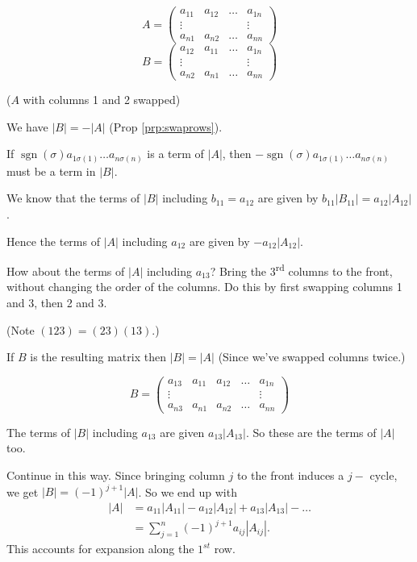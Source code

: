 \documentclass{article}
\theoremstyle{definition} \newtheorem*{definition}{Definition}
\newcommand{\ts}{\textsuperscript}
\DeclareMathOperator{\sgn}{sgn} \DeclareMathOperator{\id}{id}
\begin{document}
    \[
    A = \left( 
    \begin{matrix}
      a_{11} & a_{12} & \dots & a_{1n} \\
      \vdots &        &       & \vdots \\
      a_{n1} & a_{n2} & \dots & a_{nn}
    \end{matrix}
    \right)
  \]
  \[
    B = \left( 
    \begin{matrix}
      a_{12} & a_{11} & \dots & a_{1n} \\
      \vdots &        &       & \vdots \\
      a_{n2} & a_{n1} & \dots & a_{nn}
    \end{matrix}
    \right)
    \]

   ($A$ with columns 1 and 2 swapped)

   We have $|B| = -|A|$ (Prop \ref{prp:swaprows}).

   If $\sgn(\sigma)a_{1\sigma(1)}\dots a_{n\sigma(n)}$ is a term of $|A|$, 
   then $-\sgn(\sigma)a_{1\sigma(1)}\dots a_{n\sigma(n)}$ 
   must be a term in $|B|$.

   We know that the terms of $|B|$ including $b_{11}=a_{12}$ are
   given by $b_{11}|B_{11}| = a_{12}|A_{12}|$.

   Hence the terms of $|A|$ including $a_{12}$ are given by  $-a_{12}|A_{12}|$.

   How about the terms of $|A|$ including $a_{13}$? 
   Bring the 3\ts{rd} columns to the front, without changing the order
   of the columns. Do this by first swapping columns 1 and 3, then 2 and 3.

   (Note $(123)=(23)(13)$.)
   
   If $B$ is the resulting matrix then 
   $|B|=|A|$ (Since we've swapped columns twice.)

   \[
   B = \left( 
   \begin{matrix}
     a_{13} & a_{11} & a_{12} & \dots & a_{1n} \\
     \vdots &        &        &       & \vdots \\
     a_{n3} & a_{n1} & a_{n2} & \dots & a_{nn}
   \end{matrix}
   \right)
   \]
  

   The  terms of $|B|$ including $a_{13}$ are given $a_{13}|A_{13}|$. So
   these are the terms of $|A|$ too.

   Continue in this way. Since bringing column $j$ to the front induces a $j-$
   cycle, we get $|B|=(-1)^{j+1}|A|$. So we end up with 
   \begin{align*}
     |A| &= a_{11}|A_{11}| - a_{12}|A_{12}| + a_{13}|A_{13}| - \dots\\
     &= \sum_{j=1}^n (-1)^{j+1}a_{ij}|A_{ij}|.
   \end{align*}
   This accounts for expansion along the $1^{st}$ row.
\end{document}

